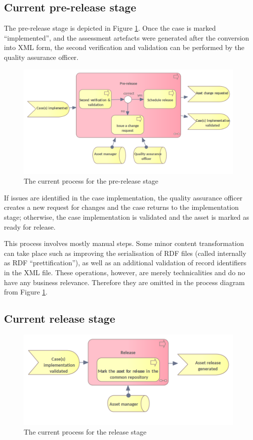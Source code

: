 	\subsection{Current pre-release stage}
	\label{sec:pre-release-current}	

	The pre-release stage is depicted in Figure \ref{fig:pre-release-current}. Once the case is marked ``implemented'', and the assessment artefacts were generated after the conversion into XML form, the second verification and validation can be performed by the quality assurance officer. 
	
	\begin{figure}[h]
		\centering
		\includegraphics[width=.65\textwidth]{images/business/current/Pre-release.png}
		\caption{The current process for the pre-release stage}
		\label{fig:pre-release-current}
	\end{figure}

	If issues are identified in the case implementation, the quality assurance officer creates a new request for changes and the case returns to the implementation stage; otherwise, the case implementation is validated and the asset is marked as ready for release. 
	
	This process involves mostly manual steps. Some minor content transformation can take place such as improving the serialisation of RDF files (called internally as RDF ``prettification''), as well as an additional validation of record identifiers in the XML file. These operations, however, are merely technicalities and do no have any business relevance. Therefore they are omitted in the process diagram from Figure \ref{fig:pre-release-current}. 

	\subsection{Current release stage}
	\label{sec:release-current}
	
	\begin{figure}[h]
		\centering
		\includegraphics[width=.6\textwidth]{images/business/current/Release.png}
		\caption{The current process for the release stage}
		\label{fig:release-current}
	\end{figure}

